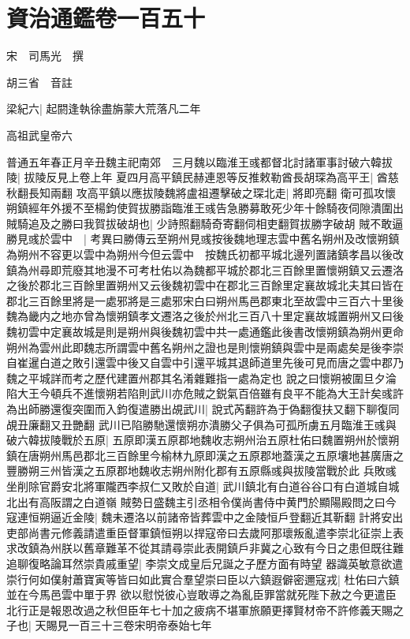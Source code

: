 \section{資治通鑑卷一百五十}
宋　司馬光　撰

胡三省　音註

梁紀六|{
	起閼逢執徐盡旃蒙大荒落凡二年}


高祖武皇帝六

普通五年春正月辛丑魏主祀南郊　三月魏以臨淮王彧都督北討諸軍事討破六韓拔陵|{
	拔陵反見上卷上年}
夏四月高平鎮民赫連恩等反推敕勒酋長胡琛為高平王|{
	酋慈秋翻長知兩翻}
攻高平鎮以應拔陵魏將盧祖遷擊破之琛北走|{
	將即亮翻}
衛可孤攻懷朔鎮經年外援不至楊鈞使賀拔勝詣臨淮王彧告急勝募敢死少年十餘騎夜伺隙潰圍出賊騎追及之勝曰我賀拔破胡也|{
	少詩照翻騎奇寄翻伺相吏翻賀拔勝字破胡}
賊不敢逼勝見彧於雲中　|{
	考異曰勝傳云至朔州見彧按後魏地理志雲中舊名朔州及改懷朔鎮為朔州不容更以雲中為朔州今但云雲中　按魏氏初都平城北邊列置諸鎮孝昌以後改鎮為州尋即荒廢其地漫不可考杜佑以為魏都平城於郡北三百餘里置懷朔鎮又云遷洛之後於郡北三百餘里置朔州又云後魏初雲中在郡北三百餘里定襄故城北夫其曰皆在郡北三百餘里將是一處邪將是三處邪宋白曰朔州馬邑郡東北至故雲中三百六十里後魏為畿内之地亦曾為懷朔鎮孝文遷洛之後於州北三百八十里定襄故城置朔州又曰後魏初雲中定襄故城是則是朔州與後魏初雲中共一處通鑑此後書改懷朔鎮為朔州更命朔州為雲州此即魏志所謂雲中舊名朔州之證也是則懷朔鎮與雲中是兩處矣是後李崇自崔暹白道之敗引還雲中後又自雲中引還平城其退師道里先後可見而唐之雲中郡乃魏之平城詳而考之歷代建置州郡其名淆雜難指一處為定也}
說之曰懷朔被圍旦夕淪陷大王今頓兵不進懷朔若陷則武川亦危賊之鋭氣百倍雖有良平不能為大王計矣彧許為出師勝還復突圍而入鈞復遣勝出覘武川|{
	說式芮翻許為于偽翻復扶又翻下聊復同覘丑廉翻又丑艷翻}
武川已陷勝馳還懷朔亦潰勝父子俱為可孤所虜五月臨淮王彧與破六韓拔陵戰於五原|{
	五原即漢五原郡地魏收志朔州治五原杜佑曰魏置朔州於懷朔鎮在唐朔州馬邑郡北三百餘里今榆林九原即漢之五原郡地蓋漢之五原壤地甚廣唐之豐勝朔三州皆漢之五原郡地魏收志朔州附化郡有五原縣彧與拔陵當戰於此}
兵敗彧坐削除官爵安北將軍隴西李叔仁又敗於自道|{
	武川鎮北有白道谷谷口有白道城自城北出有高阪謂之白道嶺}
賊勢日盛魏主引丞相令僕尚書侍中黄門於顯陽殿問之曰今寇連恒朔逼近金陵|{
	魏未遷洛以前諸帝皆葬雲中之金陵恒戶登翻近其靳翻}
計將安出吏部尚書元修義請遣重臣督軍鎮恒朔以捍寇帝曰去歲阿那瓌叛亂遣李崇北征崇上表求改鎮為州朕以舊章難革不從其請尋崇此表開鎮戶非冀之心致有今日之患但既往難追聊復略論耳然崇貴戚重望|{
	李崇文成皇后兄誕之子歷方面有時望}
器識英敏意欲遣崇行何如僕射蕭寶寅等皆曰如此實合羣望崇曰臣以六鎮遐僻密邇寇戎|{
	杜佑曰六鎮並在今馬邑雲中單于界}
欲以慰悦彼心豈敢導之為亂臣罪當就死陛下赦之今更遣臣北行正是報恩改過之秋但臣年七十加之疲病不堪軍旅願更擇賢材帝不許修義天賜之子也|{
	天賜見一百三十三卷宋明帝泰始七年}



